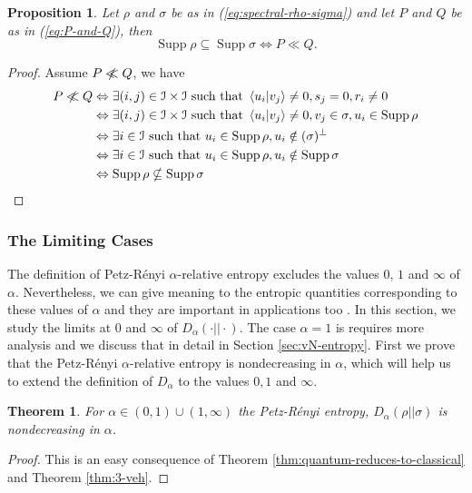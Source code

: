 \documentclass[12pt,a4paper,oneside]{article}
\numberwithin{equation}{section}
\theoremstyle{definition}  %
\theoremstyle{plain}  %
\newtheorem{thm}[defn]{Theorem}
\newtheorem{prop}[defn]{Proposition}
\theoremstyle{remark} %
\newcommand{\nll}{\centernot{\ll}}
\let\ker\relax
\DeclareMathOperator{\ker}{Ker}
\DeclareMathOperator{\supp}{Supp}
\begin{document}
 \begin{prop}\label{prop:support-condition-iff-absolute-continuity}
Let $\rho$ and $\sigma$ be as in (\ref{eq:spectral-rho-sigma})  and let $P$ and $Q$ be as in (\ref{eq:P-and-Q}), then \[\supp \rho \subseteq \supp \sigma \Leftrightarrow P\ll Q.\]
\end{prop}
\begin{proof}Assume $ P\nll Q$, we have
\begin{align*}
    P\nll Q &\Leftrightarrow \exists (i,j) \in \mathcal{I}\times \mathcal{I} \textnormal{ such that } \braket{u_i}{v_j} \neq 0, s_j=0,r_i\neq 0\\
    &\Leftrightarrow \exists (i,j) \in \mathcal{I}\times \mathcal{I} \textnormal{ such that } \braket{u_i}{v_j} \neq 0, v_j\in \ker \sigma, u_i \in \supp \rho\\
    &\Leftrightarrow \exists i\in \mathcal{I} \textnormal{ such that } u_i \in \supp \rho,  u_i \notin (\ker \sigma )^\perp\\
    &\Leftrightarrow \exists i\in \mathcal{I} \textnormal{ such that } u_i \in \supp \rho,  u_i \notin \supp \sigma\\
     &\Leftrightarrow \supp \rho \nsubseteq \supp \sigma
\end{align*}
\end{proof}
\subsubsection{The Limiting Cases}
The definition of Petz-R\'enyi $\alpha$-relative entropy excludes the values $0$, $1$ and $\infty$ of $\alpha$. Nevertheless, we can give meaning to the  entropic quantities corresponding to these values of $\alpha$ and they are important in applications too \cite{Datta2009, muller-tomamichel-etal-2013, Datta_Leditzky_2014}. In this section, we study the limits at $0$ and $\infty$ of $D_{\alpha}(\cdot||\cdot)$. The case $\alpha= 1$ is requires more analysis and we discuss that in detail in Section \ref{sec:vN-entropy}.
First we prove that the  Petz-R\'enyi $\alpha$-relative entropy is nondecreasing in $\alpha$, which will help us to extend the definition of $D_{\alpha}$ to the values $0, 1$ and $\infty$.
\begin{thm} \label{thm:3-veh-quantum}
For $\alpha\in (0,1)\cup(1,\infty)$ the  Petz-R\'enyi entropy, $D_{\alpha}(\rho||\sigma)$ is nondecreasing in $\alpha$.
\end{thm}
\begin{proof}
This is an easy consequence of Theorem \ref{thm:quantum-reduces-to-classical} and Theorem \ref{thm:3-veh}.
\end{proof}
\end{document}
